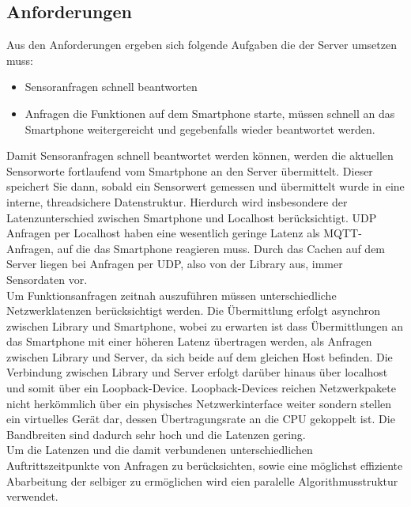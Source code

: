 \documentclass[11pt,a4paper]{report}
\begin{document}
\subsection{Anforderungen}
Aus den Anforderungen ergeben sich folgende Aufgaben die der Server umsetzen muss:
\begin{itemize}
\item Sensoranfragen schnell beantworten
\item Anfragen die Funktionen auf dem Smartphone starte, müssen schnell an das Smartphone weitergereicht und gegebenfalls wieder beantwortet werden.
\end{itemize}
Damit Sensoranfragen schnell beantwortet werden können, werden die aktuellen Sensorworte fortlaufend vom Smartphone an den Server übermittelt.
Dieser speichert Sie dann, sobald ein Sensorwert gemessen und übermittelt wurde in eine interne, threadsichere Datenstruktur.
Hierdurch wird insbesondere der Latenzunterschied zwischen Smartphone und Localhost berücksichtigt.
UDP Anfragen per Localhost haben eine wesentlich geringe Latenz als MQTT-Anfragen, auf die das Smartphone reagieren muss.
Durch das Cachen auf dem Server liegen bei Anfragen per UDP, also von der Library aus, immer Sensordaten vor.
\\
Um Funktionsanfragen zeitnah auszuführen müssen unterschiedliche Netzwerklatenzen berücksichtigt werden.
Die Übermittlung erfolgt asynchron zwischen Library und Smartphone, wobei zu erwarten ist dass Übermittlungen an das Smartphone mit einer höheren Latenz übertragen werden, als Anfragen zwischen Library und Server, da sich beide auf dem gleichen Host befinden.
Die Verbindung zwischen Library und Server erfolgt darüber hinaus über localhost und somit über ein Loopback-Device.
Loopback-Devices reichen Netzwerkpakete nicht herkömmlich über ein physisches Netzwerkinterface weiter sondern stellen ein virtuelles Gerät dar, dessen Übertragungsrate an die CPU gekoppelt ist.
Die Bandbreiten sind dadurch sehr hoch und die Latenzen gering.
\\
Um die Latenzen und die damit verbundenen unterschiedlichen Auftrittszeitpunkte von Anfragen zu berücksichten, sowie eine möglichst effiziente Abarbeitung der selbiger zu ermöglichen wird eien paralelle Algorithmusstruktur verwendet.
\end{document}
